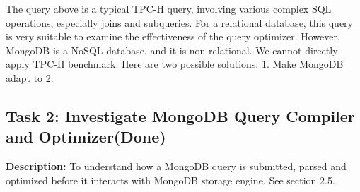 The query above is a typical TPC-H query, involving various complex SQL operations, especially joins and subqueries. For a relational database, this query is very suitable to examine the effectiveness of the query optimizer. However, MongoDB is a NoSQL database, and it is non-relational. We cannot directly apply TPC-H benchmark. Here are two possible solutions:
1. Make MongoDB adapt to 
2. 


\subsection{Task 2: Investigate MongoDB Query Compiler and Optimizer(Done)}
\noindent\textbf{Description: } To understand how a MongoDB query is submitted, parsed and optimized before it interacts with MongoDB storage engine. See section 2.5.


